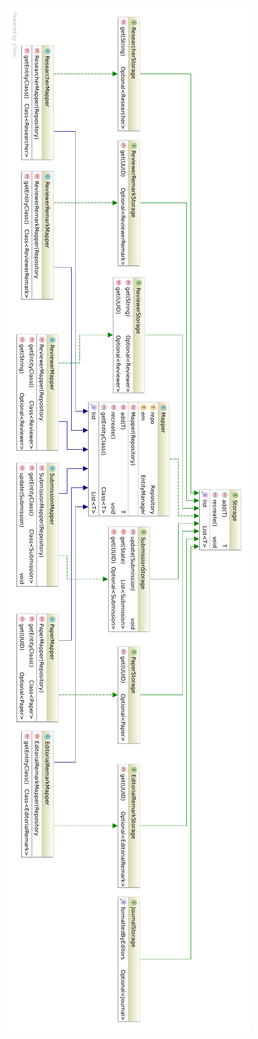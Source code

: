 \begin{figure}[H]
\centering
\includegraphics[height=0.97\textheight]{diagram3.pdf}
\caption{}
\label{fig:mapper}
\end{figure}

